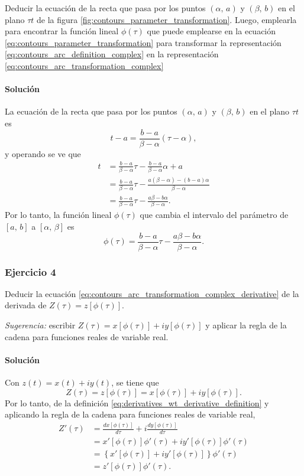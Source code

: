 \documentclass[a4paper]{report}
\begin{document}
Deducir la ecuación de la recta que pasa por los puntos \((\alpha,\,a)\) y \((\beta,\,b)\) en el plano \(\tau t\) de la figura \ref{fig:contours_parameter_transformation}. Luego, emplearla para encontrar la función lineal \(\phi(\tau)\) que puede emplearse en la ecuación \ref{eq:contours_parameter_transformation} para transformar la representación \ref{eq:contours_arc_definition_complex} en la representación \ref{eq:contours_arc_transformation_complex}

\paragraph{Solución} La ecuación de la recta que pasa por los puntos \((\alpha,\,a)\) y \((\beta,\,b)\) en el plano \(\tau t\) es
\[
 t-a=\frac{b-a}{\beta-\alpha}(\tau-\alpha),
\]
y operando se ve que
\begin{align*}
 t&=\frac{b-a}{\beta-\alpha}\tau-\frac{b-a}{\beta-\alpha}\alpha+a\\
  &=\frac{b-a}{\beta-\alpha}\tau-\frac{a(\beta-\alpha)-(b-a)\alpha}{\beta-\alpha}\\
  &=\frac{b-a}{\beta-\alpha}\tau-\frac{a\beta-b\alpha}{\beta-\alpha}.
\end{align*}
Por lo tanto, la función lineal \(\phi(\tau)\) que cambia el intervalo del parámetro de \([a,\,b]\) a \([\alpha,\,\beta]\) es
\[
 \phi(\tau)=\frac{b-a}{\beta-\alpha}\tau-\frac{a\beta-b\alpha}{\beta-\alpha}.
\]

\subsubsection{Ejercicio 4}

Deducir la ecuación \ref{eq:contours_arc_transformation_complex_derivative} de la derivada de \(Z(\tau)=z[\phi(\tau)]\).

\emph{Sugerencia:} escribir \(Z(\tau)=x[\phi(\tau)]+iy[\phi(\tau)]\) y aplicar la regla de la cadena para funciones reales de variable real.

\paragraph{Solución} Con \(z(t)=x(t)+iy(t)\), se tiene que 
\[
 Z(\tau)=z[\phi(\tau)]=x[\phi(\tau)]+iy[\phi(\tau)].
\]
Por lo tanto, de la definición \ref{eq:derivatives_wt_derivative_definition} y aplicando la regla de la cadena para funciones reales de variable real,
\begin{align*}
 Z'(\tau)&=\frac{dx[\phi(\tau)]}{d\tau}+i\frac{dy[\phi(\tau)]}{d\tau}\\
 &=x'[\phi(\tau)]\phi'(\tau)+iy'[\phi(\tau)]\phi'(\tau)\\
 &=\left\{x'[\phi(\tau)]+iy'[\phi(\tau)]\right\}\phi'(\tau)\\
 &=z'[\phi(\tau)]\phi'(\tau).
\end{align*}
\end{document}
